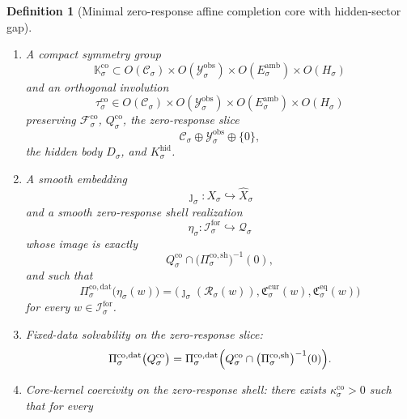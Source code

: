 \documentclass[11pt]{article}
\newcommand{\ForSpace}[1]{\mathcal I_{#1}^{\mathrm{for}}}
\newcommand{\Reduction}[1]{\mathcal R_{#1}}
\newcommand{\CurrentCarrier}[1]{\mathfrak C_{#1}^{\mathrm{cur}}}
\newcommand{\EqCarrier}[1]{\mathfrak C_{#1}^{\mathrm{eq}}}
\newcommand{\VisibleAffine}[1]{\widehat X_{#1}}
\newcommand{\DataSpace}[1]{\mathcal Y_{#1}^{\mathrm{obs}}}
\newcommand{\AmbientTarget}[1]{E_{#1}^{\mathrm{amb}}}
\newcommand{\GapSpace}[1]{H_{#1}}
\newcommand{\GapBody}[1]{D_{#1}}
\newcommand{\HiddenOperator}[1]{K_{#1}^{\mathrm{hid}}}
\newcommand{\CoreState}[1]{\mathcal C_{#1}}
\newcommand{\CoreSpace}[1]{\mathcal Q_{#1}}
\newcommand{\CoreAffine}[1]{\mathcal F_{#1}^{\mathrm{co}}}
\newcommand{\CoreBody}[1]{Q_{#1}^{\mathrm{co}}}
\newcommand{\CoreDataProj}[1]{\Pi_{#1}^{\mathrm{co,dat}}}
\newcommand{\CoreShellProj}[1]{\Pi_{#1}^{\mathrm{co,sh}}}
\newcommand{\CoreSym}[1]{\mathbb K_{#1}^{\mathrm{co}}}
\newcommand{\CoreTime}[1]{\tau_{#1}^{\mathrm{co}}}
\newcommand{\CoreEmbed}[1]{\eta_{#1}}
\newtheorem{definition}{Definition}
\begin{document}
\begin{definition}[Minimal zero-response affine completion core with hidden-sector gap]
\begin{enumerate}
    \[
    0\in\operatorname{int}\GapBody{\sigma},
    \]
    together with a positive self-adjoint hidden-sector operator
    \[
    \HiddenOperator{\sigma}:\GapSpace{\sigma}\to\GapSpace{\sigma}
    \]
    satisfying
    \begin{equation}
    \ev{\eta,\HiddenOperator{\sigma}\eta}
    \ge
    \kappa_{\sigma}^{\mathrm{hid}}\,
    \|\eta\|^{2}
    \qquad
    \text{for all }\eta\in\GapSpace{\sigma}
    \label{eq:coregap}
    \end{equation}
    for some \(\kappa_{\sigma}^{\mathrm{hid}}>0\).
    \item A compact symmetry group
    \[
    \CoreSym{\sigma}\subset
    O(\CoreState{\sigma})\times
    O(\DataSpace{\sigma})\times
    O(\AmbientTarget{\sigma})\times
    O(\GapSpace{\sigma})
    \]
    and an orthogonal involution
    \[
    \CoreTime{\sigma}\in
    O(\CoreState{\sigma})\times
    O(\DataSpace{\sigma})\times
    O(\AmbientTarget{\sigma})\times
    O(\GapSpace{\sigma})
    \]
    preserving \(\CoreAffine{\sigma}\), \(\CoreBody{\sigma}\), the zero-response slice
    \[
    \CoreState{\sigma}\oplus\DataSpace{\sigma}\oplus\{0\},
    \]
    the hidden body \(\GapBody{\sigma}\), and \(\HiddenOperator{\sigma}\).
    \item A smooth embedding
    \[
    \jmath_{\sigma}:X_{\sigma}\hookrightarrow \VisibleAffine{\sigma}
    \]
    and a smooth zero-response shell realization
    \[
    \CoreEmbed{\sigma}:\ForSpace{\sigma}\hookrightarrow\CoreSpace{\sigma}
    \]
    whose image is exactly
    \[
    \CoreBody{\sigma}\cap
    \bigl(\CoreShellProj{\sigma}\bigr)^{-1}(0),
    \]
    and such that
    \begin{equation}
    \CoreDataProj{\sigma}\bigl(\CoreEmbed{\sigma}(w)\bigr)
    =
    \bigl(
    \jmath_{\sigma}(\Reduction{\sigma}(w)),
    \CurrentCarrier{\sigma}(w),
    \EqCarrier{\sigma}(w)
    \bigr)
    \label{eq:corecompat}
    \end{equation}
    for every \(w\in\ForSpace{\sigma}\).
    \item Fixed-data solvability on the zero-response slice:
    \begin{equation}
    \CoreDataProj{\sigma}\bigl(\CoreBody{\sigma}\bigr)
    =
    \CoreDataProj{\sigma}
    \Bigl(
    \CoreBody{\sigma}\cap
    \bigl(\CoreShellProj{\sigma}\bigr)^{-1}(0)
    \Bigr).
    \label{eq:coresolvability}
    \end{equation}
    \item Core-kernel coercivity on the zero-response shell: there exists \(\kappa_{\sigma}^{\mathrm{co}}>0\) such that for every

\end{enumerate}
\end{definition}
\end{document}
